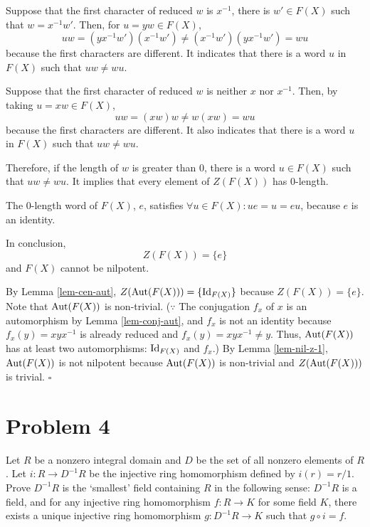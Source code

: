 \documentclass{article}
\newcommand{\qedsq}{\hfill$\square$}
\newcommand{\Aut}{\textnormal{Aut}}
\newcommand{\Id}{\textnormal{Id}}
\begin{document}
Suppose that the first character of reduced \(w\) is \(x^{-1}\), there is \(w' \in F(X)\) such that \(w = x^{-1}w'\). Then, for \(u = yw \in F(X)\),
\[ uw = (yx^{-1}w')(x^{-1}w') \neq (x^{-1}w')(yx^{-1}w') = wu \]
because the first characters are different.
It indicates that there is a word \(u\) in \(F(X)\) such that \(uw \neq wu\).

Suppose that the first character of reduced \(w\) is neither \(x\) nor \(x^{-1}\). Then, by taking \(u = xw \in F(X)\),
\[ uw = (xw)w \neq w(xw) = wu \]
because the first characters are different.
It also indicates that there is a word \(u\) in \(F(X)\) such that \(uw \neq wu\).

Therefore, if the length of \(w\) is greater than 0, there is a word \(u \in F(X)\) such that \(uw \neq wu\).
It implies that every element of \(Z(F(X))\) has 0-length.

The 0-length word of \(F(X)\), \(e\), satisfies \(\forall u \in F(X) : ue = u = eu\), because \(e\) is an identity.

In conclusion,
\[Z(F(X)) = \{e\}\]
and \(F(X)\) cannot be nilpotent.
\newline

\noindent
By Lemma \ref{lem-cen-aut}, \(Z(\Aut(F(X))) = \{\Id_{F(X)}\}\) because \(Z(F(X)) = \{e\}\).
Note that \(\Aut(F(X))\) is non-trivial.
(\(\because\) The conjugation \(f_x\) of \(x\) is an automorphism by Lemma \ref{lem-conj-aut},
and \(f_x\) is not an identity because \(f_x(y) = xyx^{-1}\) is already reduced and \(f_x(y) = xyx^{-1} \neq y\).
Thus, \(\Aut(F(X))\) has at least two automorphisms: \(\Id_{F(X)}\) and \(f_x\).)
By Lemma \ref{lem-nil-z-1}, \(\Aut(F(X))\) is not nilpotent because \(\Aut(F(X))\) is non-trivial and \(Z(\Aut(F(X)))\) is trivial.
\qedsq

\newpage
\section*{Problem 4}
Let \(R\) be a nonzero integral domain and \(D\) be the set of all nonzero elements of \(R\). Let \(i: R \to D^{-1}R\) be the injective ring homomorphism defined by \(i(r) = r/1\). Prove \(D^{-1}R\) is the `smallest' field containing \(R\) in the following sense: \(D^{-1}R\) is a field, and for any injective ring homomorphism \(f: R \to K\) for some field \(K\), there exists a unique injective ring homomorphism \(g: D^{-1}R \to K\) such that \(g \circ i = f\).
\end{document}
